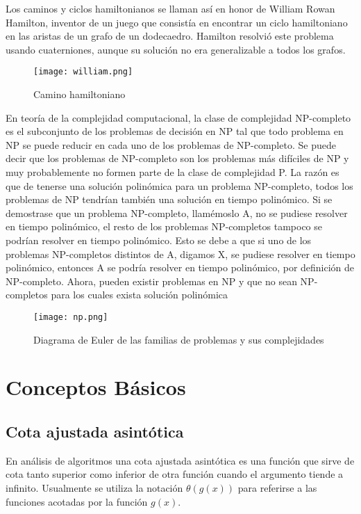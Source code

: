 \documentclass[12pt,twoside]{article}
\begin{document}
Los caminos y ciclos hamiltonianos se llaman así en honor de William Rowan Hamilton, inventor de un juego que consistía en encontrar un ciclo hamiltoniano en las aristas de un grafo de un dodecaedro. Hamilton resolvió este problema usando cuaterniones, aunque su solución no era generalizable a todos los grafos.
\begin{figure}[H]
\centering
\texttt{[image: william.png]}
\caption{Camino hamiltoniano}
\end{figure}
En teoría de la complejidad computacional, la clase de complejidad NP-completo es el subconjunto de los problemas de decisión en NP tal que todo problema en NP se puede reducir en cada uno de los problemas de NP-completo. Se puede decir que los problemas de NP-completo son los problemas más difíciles de NP y muy probablemente no formen parte de la clase de complejidad P. La razón es que de tenerse una solución polinómica para un problema NP-completo, todos los problemas de NP tendrían también una solución en tiempo polinómico. Si se demostrase que un problema NP-completo, llamémoslo A, no se pudiese resolver en tiempo polinómico, el resto de los problemas NP-completos tampoco se podrían resolver en tiempo polinómico. Esto se debe a que si uno de los problemas NP-completos distintos de A, digamos X, se pudiese resolver en tiempo polinómico, entonces A se podría resolver en tiempo polinómico, por definición de NP-completo. Ahora, pueden existir problemas en NP y que no sean NP-completos para los cuales exista solución polinómica

\begin{figure}[H]
\centering
\texttt{[image: np.png]}
\caption{Diagrama de Euler de las familias de problemas y sus complejidades}
\end{figure}


\label{sec:introduction}
\section{Conceptos Básicos}

\subsection{Cota ajustada asintótica}
En análisis de algoritmos una cota ajustada asintótica es una función que sirve de cota tanto superior como inferior de otra función cuando el argumento tiende a infinito. Usualmente se utiliza la notación $\theta(g(x))$ para referirse a las funciones acotadas por la función $g(x)$.\cite{cota}
\end{document}
